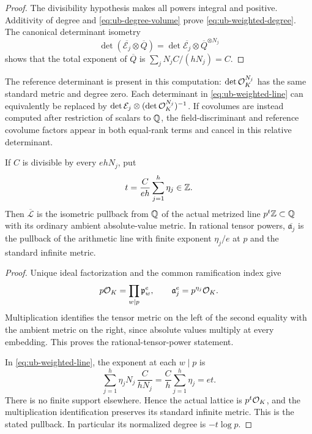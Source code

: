 \begin{proof}
The divisibility hypothesis makes all powers integral and positive.
Additivity of degree and \eqref{eq:ub-degree-volume} prove
\eqref{eq:ub-weighted-degree}. The canonical determinant isometry
\[
 \det(\overline{\mathcal E_j}\otimes\overline Q)
       =\det\overline{\mathcal E_j}\otimes\overline Q^{\otimes N_j}
\]
shows that the total exponent of $\overline Q$ is
$\sum_jN_jC/(hN_j)=C$.
\end{proof}

The reference determinant is present in this computation:
$\det\mathcal O_K^{N_j}$ has the same standard metric and degree zero.
Each determinant in \eqref{eq:ub-weighted-line} can equivalently be
replaced by
$\det\mathcal E_j\otimes(\det\mathcal O_K^{N_j})^{-1}$.
If covolumes are instead computed after restriction of scalars to
$\mathbb Q$, the field-discriminant and reference covolume factors appear
in both equal-rank terms and cancel in this relative determinant.

\begin{corollary}
\label{cor:ub-descent}
If $C$ is divisible by every $ehN_j$, put
\begin{equation}\label{eq:ub-descent-exponent}
 t=\frac{C}{eh}\sum_{j=1}^h\eta_j\in\mathbb Z.
\end{equation}
Then $\overline{\mathcal L}$ is the isometric pullback from $\mathbb Q$ of
the actual metrized line $p^t\mathbb Z\subset\mathbb Q$ with its ordinary ambient
absolute-value metric. In rational tensor powers,
$\overline{\mathfrak a_j}$ is the pullback of the arithmetic line
with finite exponent $\eta_j/e$ at $p$ and the standard infinite
metric.
\end{corollary}

\begin{proof}
Unique ideal factorization and the common ramification index give
\begin{equation}\label{eq:ub-descent-ideal}
 p\mathcal O_K=\prod_{w\mid p}\mathfrak p_w^e,\qquad
 \mathfrak a_j^e=p^{\eta_j}\mathcal O_K.
\end{equation}
Multiplication identifies the tensor metric on the left of the
second equality with the ambient metric on the right, since
absolute values multiply at every embedding. This proves the
rational-tensor-power statement.

In \eqref{eq:ub-weighted-line}, the exponent at each $w\mid p$ is
\[
 \sum_{j=1}^h\eta_jN_j\,\frac{C}{hN_j}
      =\frac Ch\sum_{j=1}^h\eta_j=et.
\]
There is no finite support elsewhere. Hence the actual lattice is
$p^t\mathcal O_K$, and the multiplication identification preserves its
standard infinite metric. This is the stated pullback. In
particular its normalized degree is $-t\log p$.
\end{proof}

